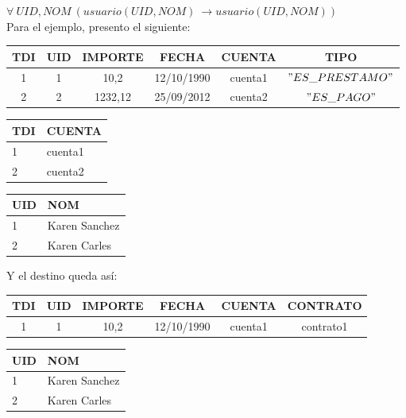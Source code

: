 $\forall\ UID, NOM\ (usuario(UID, NOM)\ \longrightarrow usuario(UID, NOM))$ \\

Para el ejemplo, presento el siguiente: \\

\begin{table}[h]
	\begin{tabular}{c|c|c|c|c|c}
		TDI  & UID & IMPORTE & FECHA & CUENTA & TIPO \\ \hline
		1 & 1 & 10,2 & 12/10/1990 &  cuenta1 & $"ES\_PRESTAMO"$ \\
		2 & 2 & 1232,12 & 25/09/2012 & cuenta2 & $"ES\_PAGO"$ \\
	\end{tabular}
\end{table}

\begin{table}[h]
	\begin{tabular}{l|l}
		TDI  & CUENTA \\ \hline
		1 & cuenta1 \\
		2 & cuenta2 \\
	\end{tabular}
\end{table}

\begin{table}[h]
	\begin{tabular}{l|l}
		UID & NOM\\ \hline
		 1 & Karen Sanchez \\
		 2 & Karen Carles  \\
	\end{tabular}
\end{table}

Y el destino queda así: \\

\begin{table}[h]
	\begin{tabular}{c|c|c|c|c|c}
		TDI  & UID & IMPORTE & FECHA & CUENTA & CONTRATO\\ \hline
		1 & 1 & 10,2 & 12/10/1990 &  cuenta1 & contrato1 \\
	\end{tabular}
\end{table}

\begin{table}[h]
	\begin{tabular}{l|l}
		UID  & NOM\\ \hline
		1 & Karen Sanchez \\
		2 & Karen Carles  \\
	\end{tabular}
\end{table}


\bigskip